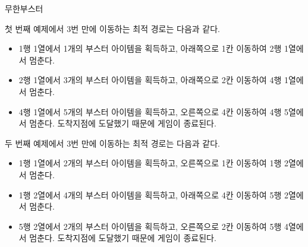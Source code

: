 \begin{problem}{무한부스터}
    \Examples
    
    \begin{example}
    \end{example}
    
    \Explanation
    
    첫 번째 예제에서 3번 만에 이동하는 최적 경로는 다음과 같다.
    \begin{itemize}
        \item 1행 1열에서 1개의 부스터 아이템을 획득하고, 아래쪽으로 1칸 이동하여 2행 1열에서 멈춘다.
        \item 2행 1열에서 3개의 부스터 아이템을 획득하고, 아래쪽으로 2칸 이동하여 4행 1열에서 멈춘다.
        \item 4행 1열에서 5개의 부스터 아이템을 획득하고, 오른쪽으로 4칸 이동하여 4행 5열에서 멈춘다. 도착지점에 도달했기 때문에 게임이 종료된다.
    \end{itemize}
    
    두 번째 예제에서 3번 만에 이동하는 최적 경로는 다음과 같다.
    \begin{itemize}
        \item 1행 1열에서 2개의 부스터 아이템을 획득하고, 오른쪽으로 1칸 이동하여 1행 2열에서 멈춘다.
        \item 1행 2열에서 4개의 부스터 아이템을 획득하고, 아래쪽으로 4칸 이동하여 5행 2열에서 멈춘다.
        \item 5행 2열에서 2개의 부스터 아이템을 획득하고, 오른쪽으로 2칸 이동하여 5행 4열에서 멈춘다. 도착지점에 도달했기 때문에 게임이 종료된다.
    \end{itemize}
    
\end{problem}

